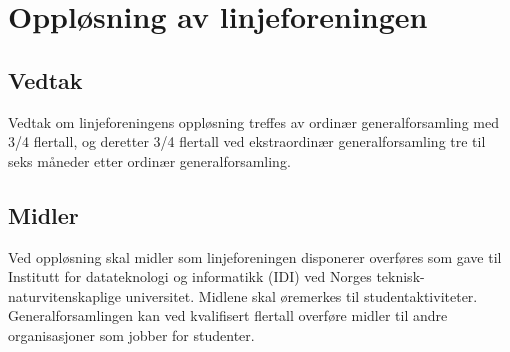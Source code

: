 \chapter{Oppløsning av linjeforeningen}
\section{Vedtak}
\vspace{23pt}

Vedtak om linjeforeningens oppløsning treffes av ordinær generalforsamling med 3/4 flertall, og deretter 3/4 flertall ved ekstraordinær generalforsamling tre til seks måneder etter ordinær generalforsamling.

\section{Midler}
\vspace{23pt}

Ved oppløsning skal midler som linjeforeningen disponerer overføres som gave til \mbox{Institutt} for datateknologi og informatikk (IDI) ved Norges teknisk-\linebreak naturvitenskaplige universitet. Midlene skal øremerkes til studentaktiviteter. Generalforsamlingen kan ved kvalifisert flertall overføre midler til andre organisasjoner som jobber for studenter.
